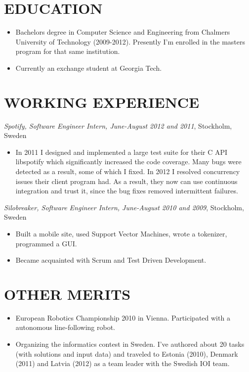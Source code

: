 \documentclass[11pt]{res} %
\begin{document}
\begin{resume}
\section{EDUCATION}
 \begin{itemize} %
   \item Bachelors degree in Computer Science and Engineering from Chalmers
     University of Technology (2009-2012). Presently I'm
     enrolled in the masters program for that same
     institution.
   \item Currently an exchange student at Georgia Tech.
 \end{itemize}

\section{WORKING EXPERIENCE}
\emph{Spotify, Software Engineer Intern, June-August 2012 and 2011}, Stockholm, Sweden
\vspace{0.2in}
   \begin{itemize} %
   \item In 2011 I designed and implemented a large test suite for their C API
     libspotify which significantly increased the code coverage. Many bugs were
     detected as a result, some of which I fixed. In 2012 I resolved
     concurrency issues their client program had. As a result, they now can use
     continuous integration and trust it, since the bug fixes removed
     intermittent failures.

 \end{itemize}


\emph{Silobreaker, Software Engineer Intern, June-August 2010 and 2009}, Stockholm, Sweden
\vspace{0.2in}
 \begin{itemize} %
  \item Built a mobile site, used Support Vector Machines, wrote a tokenizer,
   programmed a GUI.
  \item Became acquainted with Scrum and Test Driven Development.
\end{itemize}

\section{OTHER MERITS}

   \begin{itemize} %
   \item European Robotics Championship 2010 in Vienna.
    Participated with a autonomous line-following robot.
   \item Organizing the informatics contest in Sweden.  I've authored about
     20 tasks (with solutions and input data) and traveled to Estonia (2010),
     Denmark (2011) and Latvia (2012) as a team leader with the Swedish IOI
     team.
 \end{itemize}

\end{resume}
\end{document}
